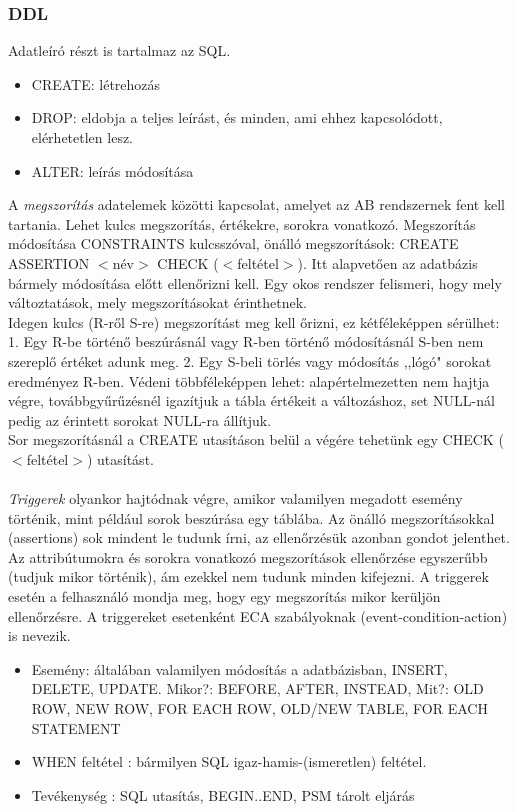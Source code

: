\documentclass[margin=0px]{article}
\begin{document}
\subsubsection{DDL}

Adatleíró részt is tartalmaz az SQL.
\begin{itemize}
    \item CREATE: létrehozás
    \item DROP: eldobja a teljes leírást, és minden, ami ehhez kapcsolódott, elérhetetlen lesz.
    \item ALTER: leírás módosítása
\end{itemize}
A \textit{megszorítás} adatelemek közötti kapcsolat, amelyet az AB rendszernek fent kell tartania. Lehet kulcs megszorítás, értékekre, sorokra vonatkozó. Megszorítás módosítása CONSTRAINTS kulcsszóval, önálló megszorítások: CREATE ASSERTION $<$név$>$ CHECK ($<$feltétel$>$). Itt alapvetően az adatbázis bármely módosítása előtt ellenőrizni kell. Egy okos rendszer felismeri, hogy mely változtatások, mely megszorításokat érinthetnek. \\
Idegen kulcs (R-ről S-re) megszorítást meg kell őrizni, ez kétféleképpen sérülhet: 1. Egy R-be történő beszúrásnál vagy R-ben történő módosításnál S-ben nem szereplő értéket adunk meg. 2. Egy S-beli törlés vagy módosítás ,,lógó" sorokat eredményez R-ben. Védeni többféleképpen lehet: alapértelmezetten nem hajtja végre, továbbgyűrűzésnél igazítjuk a tábla értékeit a változáshoz, set NULL-nál pedig az érintett sorokat NULL-ra állítjuk. \\
Sor megszorításnál a CREATE utasításon belül a végére tehetünk egy CHECK ($<$feltétel$>$) utasítást. \\ \\
\textit{Triggerek} olyankor hajtódnak végre, amikor valamilyen megadott esemény történik, mint például sorok beszúrása egy táblába. Az önálló megszorításokkal (assertions) sok mindent le tudunk írni, az ellenőrzésük azonban gondot jelenthet. Az attribútumokra és sorokra vonatkozó megszorítások ellenőrzése egyszerűbb (tudjuk mikor történik), ám ezekkel nem tudunk minden kifejezni. A triggerek esetén a felhasználó mondja meg, hogy egy megszorítás mikor kerüljön ellenőrzésre. A triggereket esetenként ECA szabályoknak (event-condition-action) is nevezik.
\begin{itemize}
    \item Esemény: általában valamilyen módosítás a adatbázisban, INSERT, DELETE, UPDATE. Mikor?: BEFORE, AFTER, INSTEAD, Mit?: OLD ROW, NEW ROW, FOR EACH ROW, OLD/NEW TABLE, FOR EACH STATEMENT
    \item WHEN feltétel : bármilyen SQL igaz-hamis-(ismeretlen) feltétel.
    \item Tevékenység : SQL utasítás, BEGIN..END, PSM tárolt eljárás
\end{itemize}
\end{document}
